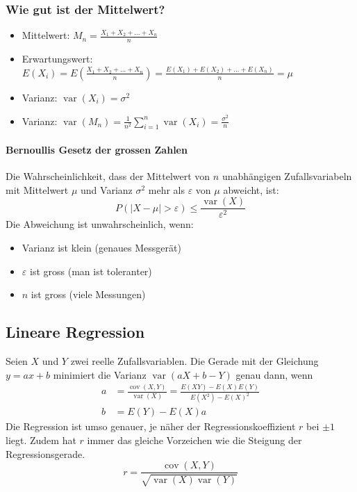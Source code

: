 \subsubsection{Wie gut ist der Mittelwert?}
\begin{itemize}
  \item Mittelwert: $M_n = \frac{X_1 + X_2 + \ldots + X_n}{n}$
  \item Erwartungswert: $E(X_i) = E\left( \frac{X_1 + X_2 + \ldots +
  X_n}{n}\right) =  \frac{E(X_1) + E(X_2) + \ldots + E(X_n)}{n} = \mu$
  \item Varianz: $\operatorname{var}(X_i) = \sigma^2$
  \item Varianz: $\operatorname{var}(M_n) = \frac{1}{n^2} \sum_{i=1}^n
  \operatorname{var}(X_i) = \frac{\sigma^2}{n}$
\end{itemize}
\paragraph{Bernoullis Gesetz der grossen Zahlen}
Die Wahrscheinlichkeit, dass der Mittelwert von $n$ unabhängigen
Zufallsvariabeln mit Mittelwert $\mu$ und Varianz $\sigma^2$ mehr als
$\varepsilon$ von $\mu$ abweicht, ist:
\[P(|X-\mu| > \varepsilon) \le \frac{\operatorname{var}(X)}{\varepsilon^2} \]
Die Abweichung ist unwahrscheinlich, wenn:
\begin{itemize}
  \item Varianz ist klein (genaues Messgerät)
  \item $\varepsilon$ ist gross (man ist toleranter)
  \item $n$ ist gross (viele Messungen)
\end{itemize}

\subsection{Lineare Regression}
Seien $X$ und $Y$ zwei reelle Zufallsvariablen. Die Gerade mit der
Gleichung $y = ax + b$ minimiert die Varianz $\operatorname{var}(aX + b -Y)$
genau dann, wenn
\begin{align*}
  a & = \frac{\operatorname{cov}(X,Y)}{\operatorname{var}(X)} = \frac{E(XY)
        - E(X)E(Y)}{E(X^2) - E(X)^2} \\
  b & = E(Y) - E(X)a
\end{align*}
Die Regression ist umso genauer, je näher der Regressionskoeffizient $r$
bei $\pm 1$ liegt. Zudem hat $r$ immer das gleiche Vorzeichen wie die
Steigung der Regressionsgerade.
\[ r = \frac{\operatorname{cov}(X,Y)}
  {\sqrt{\operatorname{var}(X)\operatorname{var}(Y)}} \]

